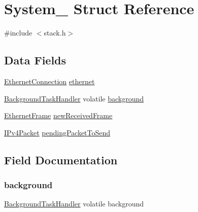 \hypertarget{struct_system__}{}\section{System\+\_\+ Struct Reference}
\label{struct_system__}


{\ttfamily \#include $<$stack.\+h$>$}

\subsection*{Data Fields}
\begin{DoxyCompactItemize}
\item 
\mbox{\hyperlink{ethernet_types_8h_a79416248249faca249ce5028e909f667}{Ethernet\+Connection}} \mbox{\hyperlink{struct_system___ab2e5d6951e766b96b9efe5540f4bd857}{ethernet}}
\item 
\mbox{\hyperlink{group__background_gad47b3415c13ac85eb0e878091441c53f}{Background\+Task\+Handler}} volatile \mbox{\hyperlink{struct_system___ad0af9bf2d27328ff7a3c7c253759ede7}{background}}
\item 
\mbox{\hyperlink{ethernet_types_8h_a4ebb2d31f9c7739f76b97c8ee0a7b702}{Ethernet\+Frame}} \mbox{\hyperlink{struct_system___acce4d7d9a581bdc9e2d7f6baafc4915f}{new\+Received\+Frame}}
\item 
\mbox{\hyperlink{group__ipv4_ga1a3db8172a6bdf4bb1957929ca11710c}{I\+Pv4\+Packet}} \mbox{\hyperlink{struct_system___a5b1fe5efc3ada8a585cde6c6b08dbb67}{pending\+Packet\+To\+Send}}
\end{DoxyCompactItemize}


\subsection{Field Documentation}
\mbox{\label{struct_system___ad0af9bf2d27328ff7a3c7c253759ede7}} 
\subsubsection{\texorpdfstring{background}{background}}
{\footnotesize\ttfamily \mbox{\hyperlink{group__background_gad47b3415c13ac85eb0e878091441c53f}{Background\+Task\+Handler}} volatile background}

\mbox{\label{struct_system___ab2e5d6951e766b96b9efe5540f4bd857}} 
